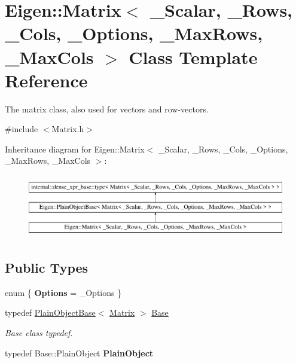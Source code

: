 \hypertarget{class_eigen_1_1_matrix}{}\section{Eigen\+::Matrix$<$ \+\_\+\+Scalar, \+\_\+\+Rows, \+\_\+\+Cols, \+\_\+\+Options, \+\_\+\+Max\+Rows, \+\_\+\+Max\+Cols $>$ Class Template Reference}
\label{class_eigen_1_1_matrix}


The matrix class, also used for vectors and row-\/vectors.  




{\ttfamily \#include $<$Matrix.\+h$>$}

Inheritance diagram for Eigen\+::Matrix$<$ \+\_\+\+Scalar, \+\_\+\+Rows, \+\_\+\+Cols, \+\_\+\+Options, \+\_\+\+Max\+Rows, \+\_\+\+Max\+Cols $>$\+:\begin{figure}[H]
\begin{center}
\leavevmode
\includegraphics[height=2.804674cm]{class_eigen_1_1_matrix}
\end{center}
\end{figure}
\subsection*{Public Types}
\begin{DoxyCompactItemize}
\item 
\mbox{\label{class_eigen_1_1_matrix_a22b58cabad2d0d658473f712f8a4f4f0}} 
enum \{ {\bfseries Options} = \+\_\+\+Options
 \}
\item 
typedef \mbox{\hyperlink{class_eigen_1_1_plain_object_base}{Plain\+Object\+Base}}$<$ \mbox{\hyperlink{class_eigen_1_1_matrix}{Matrix}} $>$ \mbox{\hyperlink{class_eigen_1_1_matrix_a9f405923954599ec7a71ee6bad2c53f1}{Base}}
\begin{DoxyCompactList}\small\item\em Base class typedef. \end{DoxyCompactList}\item 
\mbox{\label{class_eigen_1_1_matrix_a0b2581c382c89ef56286cb81a219f03b}} 
typedef Base\+::\+Plain\+Object {\bfseries Plain\+Object}
\end{DoxyCompactItemize}
